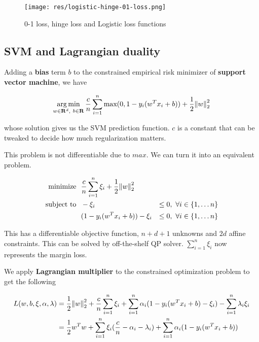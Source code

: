 \documentclass{article}
\DeclareMathOperator*{\argmin}{arg\,min}
\begin{document}
\begin{figure}[h]
\centering
\texttt{[image: res/logistic-hinge-01-loss.png]}
\caption{0-1 loss, hinge loss and Logistic loss functions}
\label{logistic-hinge-01-loss}
\end{figure}

\subsection{SVM and Lagrangian duality}

Adding a \textbf{bias} term $b$ to the constrained empirical risk minimizer of \textbf{support vector machine}, we have

$$
\argmin_{w \in \mathbf{R}^{d}, ~ b \in \mathbf{R}}{\frac{c}{n} \sum_{i = 1}^{n}{\text{max}(0, 1 - y_i (w^{T} x_i + b))} + \frac{1}{2} {\norm{w}_2^2}}
$$

whose solution gives us the SVM prediction function.
$c$ is a constant that can be tweaked to decide how much regularization matters.

This problem is not differentiable due to $max$.
We can turn it into an equivalent problem.

\begin{align*}
\text{minimize}   ~~& \frac{c}{n} \sum_{i = 1}^{n}{\xi_i} + \frac{1}{2} {\norm{w}_2^2} \\
\text{subject to} ~~& -\xi_i &\leq 0, ~ \forall i \in \{1, \dots n\} \\
                  & (1 - y_i (w^{T} x_i + b)) - \xi_i &\leq 0, ~ \forall i \in \{1, \dots n\}
\end{align*}

This has a differentiable objective function, $n + d + 1$ unknowns and $2 d$ affine constraints.
This can be solved by off-the-shelf QP solver.
$\sum_{i = 1}^{n}{\xi_i}$ now represents the margin loss.

We apply \textbf{Lagrangian multiplier} to the constrained optimization problem to get the following

\begin{align*}
L(w, b, \xi, \alpha, \lambda) &= \frac{1}{2} {\norm{w}_2^2} + \frac{c}{n} \sum_{i = 1}^{n}{\xi_i} + \sum_{i = 1}^{n}{\alpha_i (1 - y_i (w^{T} x_i + b) - \xi_i)} - \sum_{i = 1}^{n}{\lambda_i \xi_i} \\
                              &= \frac{1}{2} w^{T} w + \sum_{i = 1}^{n}{\xi_i (\frac{c}{n} - \alpha_i - \lambda_i)} + \sum_{i = 1}^{n}{\alpha_i (1 - y_i (w^{T} x_i + b))}
\end{align*}
\end{document}
